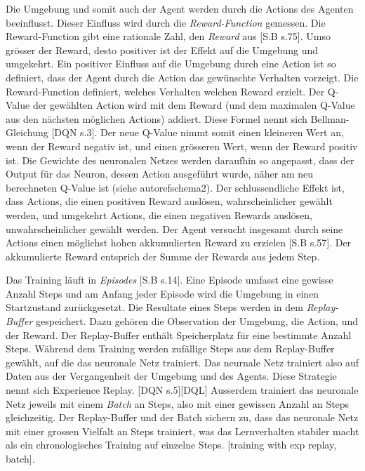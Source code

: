 
Die Umgebung und somit auch der Agent werden durch die Actions des Agenten
beeinflusst. Dieser Einfluss wird durch die \emph{Reward-Function} gemessen. Die
Reward-Function gibt eine rationale Zahl, den \emph{Reward} aus [S.B s.75]. Umso grösser
der Reward, desto positiver ist der Effekt auf die Umgebung und umgekehrt. Ein
positiver Einfluss auf die Umgebung durch eine Action ist so definiert, dass der
Agent durch die Action das gewünschte Verhalten vorzeigt. Die Reward-Function
definiert, welches Verhalten welchen Reward erzielt. Der Q-Value der gewählten
Action wird mit dem Reward (und dem maximalen Q-Value aus den nächsten möglichen
Actions) addiert. Diese Formel nennt sich Bellman-Gleichung [DQN s.3]. Der neue Q-Value          
nimmt somit einen kleineren Wert an, wenn der Reward negativ ist, und einen
grösseren Wert, wenn der Reward positiv ist. Die Gewichte des neuronalen Netzes
werden daraufhin so angepasst, dass der Output für das Neuron, dessen Action
ausgeführt wurde, näher am neu berechneten Q-Value ist (siehe autoref{schema2}).
Der schlussendliche Effekt ist, dass Actions, die einen positiven Reward
auslösen, wahrscheinlicher gewählt werden, und umgekehrt Actions, die einen
negativen Rewards auslösen, unwahrscheinlicher gewählt werden. Der Agent
versucht insgesamt durch seine Actions einen möglichst hohen akkumulierten
Reward zu erzielen [S.B s.57]. Der akkumulierte Reward entsprich der Summe der
Rewards aus jedem Step.


Das Training läuft in \emph{Episodes} [S.B s.14]. Eine Episode umfasst
eine gewisse Anzahl Steps und am Anfang jeder Episode wird die Umgebung in einen
Startzustand zurückgesetzt. Die Resultate eines Steps werden in dem
\emph{Replay-Buffer} gespeichert. Dazu gehören die Observation der Umgebung, die
Action, und der Reward. Der Replay-Buffer enthält Speicherplatz für eine
bestimmte Anzahl Steps. Während dem Training werden zufällige Steps aus dem
Replay-Buffer gewählt, auf die das neuronale Netz trainiert. Das neurnale Netz
trainiert also auf Daten aus der Vergangenheit der Umgebung und des Agents.
Diese Strategie nennt sich Experience Replay. [DQN s.5][DQL] Ausserdem trainiert
das neuronale Netz jeweils mit einem \emph{Batch} an Steps, also mit einer
gewissen Anzahl an Steps gleichzeitig. Der Replay-Buffer und der Batch sichern
zu, dass das neuronale Netz mit einer grossen Vielfalt an Steps trainiert, was
das Lernverhalten stabiler macht als ein chronologisches Training auf einzelne
Steps. [training with exp replay, batch].


